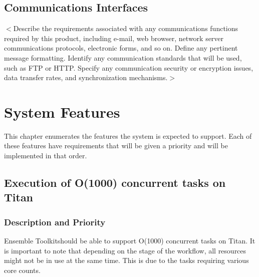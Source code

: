 \documentclass{scrreprt}
\def\entk{Ensemble Toolkit}
\begin{document}
\section{Communications Interfaces}
$<$Describe the requirements associated with any communications functions 
required by this product, including e-mail, web browser, network server 
communications protocols, electronic forms, and so on. Define any pertinent 
message formatting. Identify any communication standards that will be used, such 
as FTP or HTTP. Specify any communication security or encryption issues, data 
transfer rates, and synchronization mechanisms.$>$


\chapter{System Features}

This chapter enumerates the features the system is expected to support. Each of these features have requirements that will be given a priority and will be implemented in that order. 

\section{Execution of O(1000) concurrent tasks on Titan}

\subsection{Description and Priority}

\entk should be able to support O(1000) concurrent tasks on Titan. It is important to note that depending on the stage of the workflow, all resources might not be in use at the same time. This is due to the tasks requiring various core counts.
\end{document}
